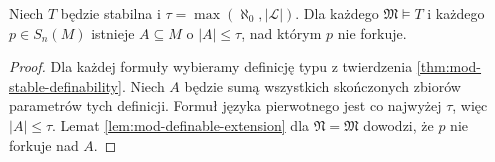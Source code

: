\begin{wniosek}
\label{cor:mod-forking-local-model}
Niech $T$ będzie stabilna i
$\tau=\max(\aleph_0,|\mathcal L|)$.
Dla każdego $\mathfrak M\models T$
i każdego $p\in S_n(M)$ istnieje
$A\subseteq M$ o $|A|\leq\tau$,
nad którym $p$ nie forkuje.
\end{wniosek}
\begin{proof}
Dla każdej formuły wybieramy definicję typu
z twierdzenia \ref{thm:mod-stable-definability}.
Niech $A$ będzie sumą wszystkich skończonych
zbiorów parametrów tych definicji.
Formuł języka pierwotnego jest co najwyżej $\tau$,
więc $|A|\leq\tau$.
Lemat \ref{lem:mod-definable-extension}
dla $\mathfrak N=\mathfrak M$ dowodzi,
że $p$ nie forkuje nad $A$.
\end{proof}

